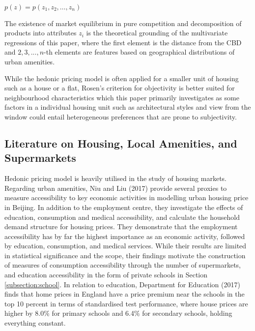 \documentclass{article}
\begin{document}
\begin{center}
    $p ( z ) = p \left( z _ { 1 } , z _ { 2 } , \dots , z _ { n } \right)$
\end{center}

The existence of market equilibrium in pure competition and decomposition of products into attributes $z_i$ is the theoretical grounding of the multivariate regressions of this paper, where the first element is the distance from the CBD and $2, 3, ..., n$-th elements are features based on geographical distributions of urban amenities.

While the hedonic pricing model is often applied for a smaller unit of housing such as a house or a flat, Rosen's criterion for objectivity is better suited for neighbourhood characteristics which this paper primarily investigates as some factors in a individual housing unit such as architectural styles and view from the window could entail heterogeneous preferences that are prone to subjectivity.

\subsection{Literature on Housing, Local Amenities, and Supermarkets} \label{subsection:lit:supermarkets}
Hedonic pricing model is heavily utilised in the study of housing markets. Regarding urban amenities, Niu and Liu (2017) provide several proxies to measure accessibility to key economic activities in modelling urban housing price in Beijing. In addition to the employment centre, they investigate the effects of education, consumption and medical accessibility, and calculate the household demand structure for housing prices. They demonstrate that the employment accessibility has by far the highest importance as an economic activity, followed by education, consumption, and medical services. While their results are limited in statistical significance and the scope, their findings motivate the construction of measures of consumption accessibility through the number of supermarkets, and education accessibility in the form of private schools in Section \ref{subsection:school}. In relation to education, Department for Education (2017) finds that home prices in England have a price premium near the schools in the top 10 percent in terms of standardised test performance, where house prices are higher by 8.0\% for primary schools and 6.4\% for secondary schools, holding everything constant.
\end{document}
